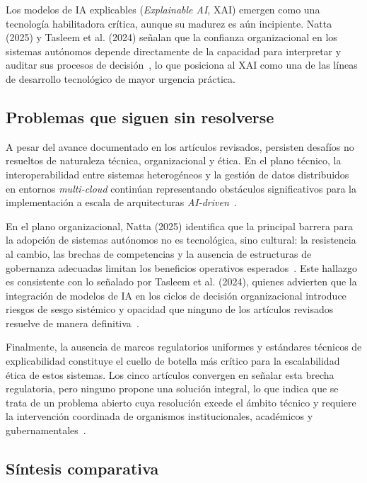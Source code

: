 \documentclass[conference]{IEEEtran}
\begin{document}
Los modelos de IA explicables (\textit{Explainable AI}, XAI) emergen como una tecnología habilitadora crítica, aunque su madurez es aún incipiente. Natta (2025) y Tasleem et al. (2024) señalan que la confianza organizacional en los sistemas autónomos depende directamente de la capacidad para interpretar y auditar sus procesos de decisión~\cite{natta2025, tasleem2024}, lo que posiciona al XAI como una de las líneas de desarrollo tecnológico de mayor urgencia práctica.
 
\subsection{Problemas que siguen sin resolverse}
 
A pesar del avance documentado en los artículos revisados, persisten desafíos no resueltos de naturaleza técnica, organizacional y ética. En el plano técnico, la interoperabilidad entre sistemas heterogéneos y la gestión de datos distribuidos en entornos \textit{multi-cloud} continúan representando obstáculos significativos para la implementación a escala de arquitecturas \textit{AI-driven}~\cite{seth2025}.
 
En el plano organizacional, Natta (2025) identifica que la principal barrera para la adopción de sistemas autónomos no es tecnológica, sino cultural: la resistencia al cambio, las brechas de competencias y la ausencia de estructuras de gobernanza adecuadas limitan los beneficios operativos esperados~\cite{natta2025}. Este hallazgo es consistente con lo señalado por Tasleem et al. (2024), quienes advierten que la integración de modelos de IA en los ciclos de decisión organizacional introduce riesgos de sesgo sistémico y opacidad que ninguno de los artículos revisados resuelve de manera definitiva~\cite{tasleem2024}.
 
Finalmente, la ausencia de marcos regulatorios uniformes y estándares técnicos de explicabilidad constituye el cuello de botella más crítico para la escalabilidad ética de estos sistemas. Los cinco artículos convergen en señalar esta brecha regulatoria, pero ninguno propone una solución integral, lo que indica que se trata de un problema abierto cuya resolución excede el ámbito técnico y requiere la intervención coordinada de organismos institucionales, académicos y gubernamentales~\cite{heilig2024, jeyanthi2022, natta2025}.
 
\subsection{Síntesis comparativa}
 
\end{document}
